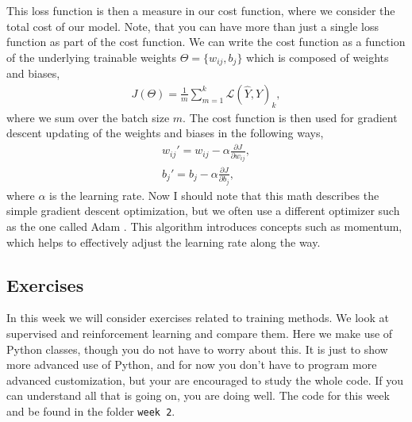 \documentclass[12pt,a4paper]{article} %
\numberwithin{equation}{section}
\newcommand{\pd}{\partial}
\begin{document}
		This loss function is then a measure in our cost function, where we consider the total cost of our model. Note, that you can have more than just a single loss function as part of the cost function. We can write the cost function as a function of the underlying trainable weights $\Theta = \{w_{ij}, b_j\}$ which is composed of weights and biases,
		\begin{gather}
			J(\Theta) = \frac{1}{m} \sum_{m=1}^{k} \mathcal{L}(\hat{Y}, Y)_k,
		\end{gather}
		where we sum over the batch size $m$. The cost function is then used for gradient descent updating of the weights and biases in the following ways,
		\begin{gather}
			w_{ij}' = w_{ij} - \alpha \frac{\pd J}{\pd w_{ij}},\\
			b_{j}' = b_j - \alpha \frac{\pd J}{\pd b_{j}},
		\end{gather}
		where $\alpha$ is the learning rate. Now I should note that this math describes the simple gradient descent optimization, but we often use a different optimizer such as the one called Adam \cite{kingma:2017}. This algorithm introduces concepts such as momentum, which helps to effectively adjust the learning rate along the way.

	\subsection{Exercises}
		In this week we will consider exercises related to training methods. We look at supervised and reinforcement learning and compare them. Here we make use of Python classes, though you do not have to worry about this. It is just to show more advanced use of Python, and for now you don't have to program more advanced customization, but your are encouraged to study the whole code. If you can understand all that is going on, you are doing well. The code for this week and be found in the folder \texttt{week 2}.\newline
		
\end{document}
